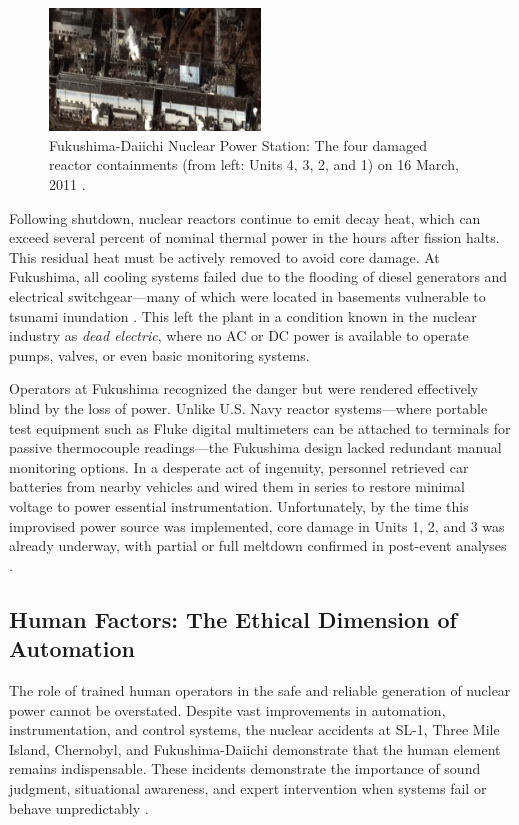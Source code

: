 \documentclass[12pt]{article}
\begin{document}
\begin{figure}[H]
  \centering
  \includegraphics[width=0.5\textwidth]{fukushimaafter.jpg}
  \caption{Fukushima-Daiichi Nuclear Power Station: The four damaged reactor containments (from left: Units 4, 3, 2, and 1) on 16 March, 2011 \autocite{worldnuclear_fukushima_review}.}
  \label{fig:containments}
\end{figure}

Following shutdown, nuclear reactors continue to emit decay heat, which can exceed several percent of nominal thermal power in the hours after fission halts. This residual heat must be actively removed to avoid core damage. At Fukushima, all cooling systems failed due to the flooding of diesel generators and electrical switchgear—many of which were located in basements vulnerable to tsunami inundation \autocite{nrc_fukushima}. This left the plant in a condition known in the nuclear industry as \textit{dead electric}, where no AC or DC power is available to operate pumps, valves, or even basic monitoring systems.

Operators at Fukushima recognized the danger but were rendered effectively blind by the loss of power. Unlike U.S. Navy reactor systems—where portable test equipment such as Fluke digital multimeters can be attached to terminals for passive thermocouple readings—the Fukushima design lacked redundant manual monitoring options. In a desperate act of ingenuity, personnel retrieved car batteries from nearby vehicles and wired them in series to restore minimal voltage to power essential instrumentation. Unfortunately, by the time this improvised power source was implemented, core damage in Units 1, 2, and 3 was already underway, with partial or full meltdown confirmed in post-event analyses \autocite{worldnuclear_fukushima_review}.

\subsection{Human Factors: The Ethical Dimension of Automation}
\label{sec:humanfactors}

The role of trained human operators in the safe and reliable generation of nuclear power cannot be overstated. Despite vast improvements in automation, instrumentation, and control systems, the nuclear accidents at SL-1, Three Mile Island, Chernobyl, and Fukushima-Daiichi demonstrate that the human element remains indispensable. These incidents demonstrate the importance of sound judgment, situational awareness, and expert intervention when systems fail or behave unpredictably \autocite{moderninstruments}.
\end{document}
